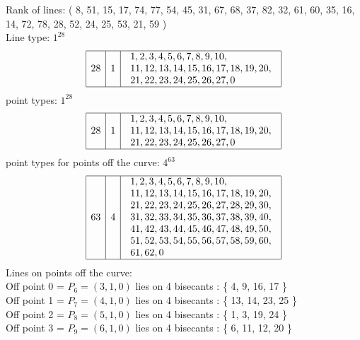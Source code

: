 Rank of lines: ( 8, 51, 15, 17, 74, 77, 54, 45, 31, 67, 68, 37, 82, 32, 61, 60, 35, 16, 14, 72, 78, 28, 52, 24, 25, 53, 21, 59 )\\
Line type: $
1^{28}$\\
$$
\begin{array}{|r|r|l|}
\hline
28 & 1 & \begin{array}{l}
1, 2, 3, 4, 5, 6, 7, 8, 9, 10, \\
11, 12, 13, 14, 15, 16, 17, 18, 19, 20, \\
21, 22, 23, 24, 25, 26, 27, 0\end{array}
\\
\hline
\end{array}
$$
point types: $
1^{28}$\\
$$
\begin{array}{|r|r|l|}
\hline
28 & 1 & \begin{array}{l}
1, 2, 3, 4, 5, 6, 7, 8, 9, 10, \\
11, 12, 13, 14, 15, 16, 17, 18, 19, 20, \\
21, 22, 23, 24, 25, 26, 27, 0\end{array}
\\
\hline
\end{array}
$$
point types for points off the curve: $
4^{63}$\\
$$
\begin{array}{|r|r|l|}
\hline
63 & 4 & \begin{array}{l}
1, 2, 3, 4, 5, 6, 7, 8, 9, 10, \\
11, 12, 13, 14, 15, 16, 17, 18, 19, 20, \\
21, 22, 23, 24, 25, 26, 27, 28, 29, 30, \\
31, 32, 33, 34, 35, 36, 37, 38, 39, 40, \\
41, 42, 43, 44, 45, 46, 47, 48, 49, 50, \\
51, 52, 53, 54, 55, 56, 57, 58, 59, 60, \\
61, 62, 0\end{array}
\\
\hline
\end{array}
$$
Lines on points off the curve:\\
Off point 0 = $P_{6} = ( 3, 1, 0 )$ lies on 4 bisecants : \{ 4, 9, 16, 17 \}\\
Off point 1 = $P_{7} = ( 4, 1, 0 )$ lies on 4 bisecants : \{ 13, 14, 23, 25 \}\\
Off point 2 = $P_{8} = ( 5, 1, 0 )$ lies on 4 bisecants : \{ 1, 3, 19, 24 \}\\
Off point 3 = $P_{9} = ( 6, 1, 0 )$ lies on 4 bisecants : \{ 6, 11, 12, 20 \}\\
